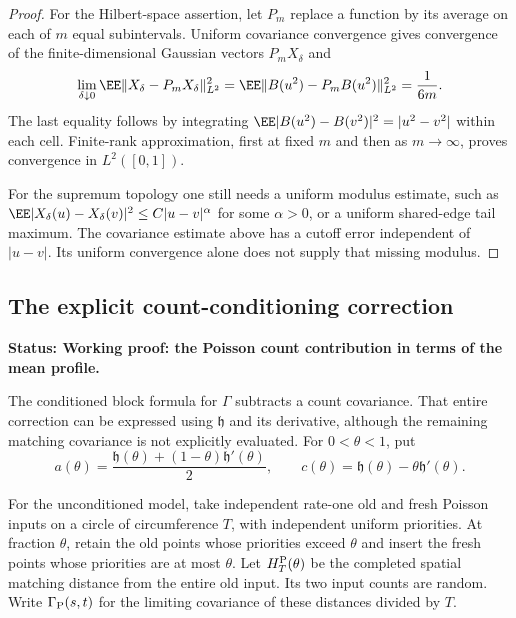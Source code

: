 \documentclass[11pt,letterpaper]{article}
\newcommand{\status}[1]{\textbf{Status: #1.}}
\begin{document}
\begin{proof}
For the Hilbert-space assertion, let $P_m$ replace a
function by its average on each of $m$ equal subintervals.
Uniform covariance convergence gives convergence of the
finite-dimensional Gaussian vectors $P_mX_\delta$ and
\[
 \lim_{\delta\downarrow0}
       \EE\|X_\delta-P_mX_\delta\|_{L^2}^2
   =\EE\|B(u^2)-P_mB(u^2)\|_{L^2}^2
   =\frac1{6m}.
\]
The last equality follows by integrating
$\EE|B(u^2)-B(v^2)|^2=|u^2-v^2|$ within each cell.
Finite-rank approximation, first at fixed $m$ and then
as $m\to\infty$, proves convergence in $L^2([0,1])$.

For the supremum topology one still needs a uniform
modulus estimate, such as
$\EE|X_\delta(u)-X_\delta(v)|^2\le C|u-v|^\alpha$
for some $\alpha>0$, or a uniform shared-edge tail maximum.
The covariance estimate above has a cutoff error independent
of $|u-v|$. Its uniform convergence alone does not supply
that missing modulus.
\end{proof}

\subsection{The explicit count-conditioning correction}
\label{sec:dense-count-correction}

\status{Working proof: the Poisson count contribution in terms of the mean profile}

The conditioned block formula for $\Gamma$ subtracts a count
covariance. That entire correction can be expressed using
$\mathfrak h$ and its derivative, although the remaining
matching covariance is not explicitly evaluated.
For $0<\theta<1$, put
\begin{equation}\label{eq:dense-count-gradients}
 a(\theta)=\frac{\mathfrak h(\theta)
                    +(1-\theta)\mathfrak h'(\theta)}2,\qquad
 c(\theta)=\mathfrak h(\theta)-\theta\mathfrak h'(\theta).
\end{equation}

For the unconditioned model, take independent rate-one old and
fresh Poisson inputs on a circle of circumference $T$, with
independent uniform priorities. At fraction $\theta$, retain
the old points whose priorities exceed $\theta$ and insert
the fresh points whose priorities are at most $\theta$.
Let $H_T^{\rm P}(\theta)$ be the completed spatial matching
distance from the entire old input. Its two input counts
are random. Write $\Gamma_{\rm P}(s,t)$ for the limiting
covariance of these distances divided by $T$.
\end{document}
